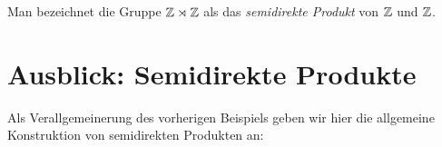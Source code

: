 Man bezeichnet die Gruppe $\mathbb{Z} \rtimes \mathbb{Z}$ als das \emph{semidirekte Produkt} von $\mathbb{Z}$ und $\mathbb{Z}$.


\section{Ausblick: Semidirekte Produkte}
Als Verallgemeinerung des vorherigen Beispiels geben wir hier die allgemeine Konstruktion von semidirekten Produkten an:



































